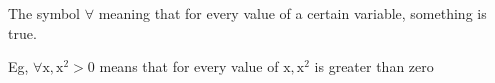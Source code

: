 The symbol $ \forall $ meaning that for every value of
a certain variable, something is true.
\par
Eg, $ \forall \mathrm{x}, \mathrm{x}^2>0 $ means that for every value of
$ \mathrm{x}, \mathrm{x}^2 $ is greater than zero